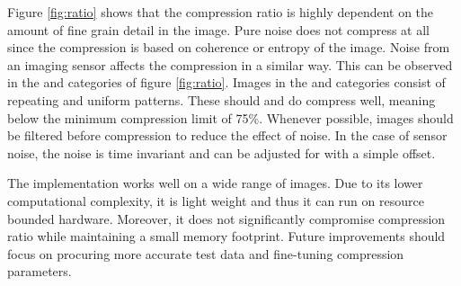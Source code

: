 \documentclass[12pt, a4paper]{article}
\begin{document}
\medskip
\noindent
Figure \ref{fig:ratio} shows that the compression ratio is highly dependent on the amount of fine grain detail in the image. 
Pure noise does not compress at all since the compression is based on coherence or entropy of the image. 
Noise from an imaging sensor affects the compression in a similar way. 
This can be observed in the  and  categories of figure \ref{fig:ratio}. 
Images in the  and  categories consist of repeating and uniform patterns. 
These should and do compress well, meaning below the minimum compression limit of 75\%.
Whenever possible, images should be filtered before compression to reduce the effect of noise. 
In the case of sensor noise, the noise is time invariant and can be adjusted for with a simple offset.

\medskip
\noindent
The implementation works well on a wide range of images. 
Due to its lower computational complexity, it is light weight and thus it can run on resource bounded hardware. 
Moreover, it does not significantly compromise compression ratio while maintaining a small memory footprint. 
Future improvements should focus on procuring more accurate test data and fine-tuning compression parameters. 
\end{document}
